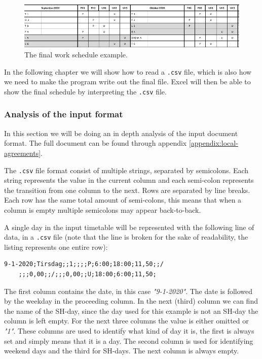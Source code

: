 \begin{figure}[ht!]
    \centering
    \includegraphics[width=\textwidth]{media/p1 schedule.JPG}
    \caption{The final work schedule example.}
    \label{fig:Output_example}
\end{figure}
 In the following chapter we will show how to read a \verb|.csv| file, which is also how we need to make the program write out the final file. Excel will then be able to show the final schedule by interpreting the \verb|.csv| file.

\subsubsection{Analysis of the input format}
\label{sec:input-analysis}
In this section we will be doing an in depth analysis of the input document format. The full document can be found through appendix \ref{appendix:local-agreements}.

The \verb|.csv| file format consist of multiple strings, separated by semicolons. Each string represents the value in the current column and each semi-colon represents the transition from one column to the next. Rows are separated by line breaks. Each row has the same total amount of semi-colons, this means that when a column is empty multiple semicolons may appear back-to-back.

A single day in the input timetable will be represented with the following line of data, in a \verb|.csv| file (note that the line is broken for the sake of readability, the listing represents one entire row):

\begin{lstlisting}[caption={Example row.}]
    9-1-2020;Tirsdag;;1;;;;P;6:00;18:00;11,50;;/
    ;;;0,00;;/;;;0,00;;U;18:00;6:00;11,50;
\end{lstlisting}

The first column contains the date, in this case \textit{"9-1-2020"}. The date is followed by the weekday in the proceeding column. In the next (third) column we can find the name of the SH-day, since the day used for this example is not an SH-day the column is left empty. For the next three columns the value is either omitted or \textit{"1"}. These columns are used to identify what kind of day it is, the first is always set and simply means that it is a day. The second column is used for identifying weekend days and the third for SH-days. The next column is always empty.

